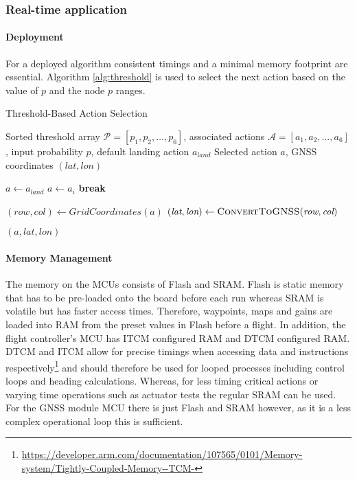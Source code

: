 \subsubsection{Real-time application}\label{sub_sub_section:tgt_real_time}
\paragraph{Deployment}
For a deployed algorithm consistent timings and a minimal memory footprint are essential. Algorithm \ref{alg:threshold} is used to select the next action based on the value of $p$ and the node $p$ ranges.
\begin{algorithm}[htbp]
  \caption{Threshold-Based Action Selection}
  \label{alg:threshold}
  \begin{algorithmic}[1]
    \Require Sorted threshold array \(\mathcal{P} = [p_1, p_2, \dots, p_6]\), associated actions \(\mathcal{A} = [a_1, a_2, \dots, a_6]\), input probability \(p\), default landing action \(a_{\textit{land}}\)
    \Ensure Selected action \(a\), GNSS coordinates \((\textit{lat}, \textit{lon})\)
    
    \State \(a \gets a_{\textit{land}}\) 
        \State \(a \gets a_i\)
        \State \textbf{break}
      \EndIf
    \EndFor
    
    \State \((\textit{row}, \textit{col}) \gets \textit{GridCoordinates}(a)\)
    \State \((\textit{lat}, \textit{lon}) \gets \Call{ConvertToGNSS}{\textit{row}, \textit{col}}\)
    
    \State \Return \((a, \textit{lat}, \textit{lon})\)
  \end{algorithmic}
\end{algorithm}
\paragraph{Memory Management}
The memory on the \gls{MCU}s consists of Flash and \gls{SRAM}. Flash is static memory that has to be pre-loaded onto the board before each run whereas \gls{SRAM} is volatile but has faster access times. Therefore, waypoints, maps and gains are loaded into \gls{RAM} from the preset values in Flash before a flight. In addition, the flight controller's \gls{MCU} has \gls{ITCM} configured \gls{RAM} and \gls{DTCM} configured \gls{RAM}. \gls{DTCM} and \gls{ITCM} allow for precise timings when accessing data and instructions respectively\footnote{\url{https://developer.arm.com/documentation/107565/0101/Memory-system/Tightly-Coupled-Memory--TCM-}} and should therefore be used for looped processes including control loops and heading calculations. Whereas, for less timing critical actions or varying time operations such as actuator tests the regular \gls{SRAM} can be used. For the \gls{GNSS} module \gls{MCU} there is just Flash and \gls{SRAM} however, as it is a less complex operational loop this is sufficient. 


